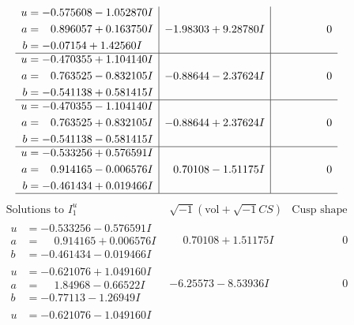 \documentclass[1p]{elsarticle_modified}
\theoremstyle{definition}
\newcommand{\I}{\sqrt{-1}}
\begin{document}
$$\begin{array}{c|c|c}
\begin{aligned}
u &= -0.575608 - 1.052870 I \\
a &= \phantom{-}0.896057 + 0.163750 I \\
b &= -0.07154 + 1.42560 I\end{aligned}
 & -1.98303 + 9.28780 I & \phantom{-0.000000 } 0 \\ \hline\begin{aligned}
u &= -0.470355 + 1.104140 I \\
a &= \phantom{-}0.763525 - 0.832105 I \\
b &= -0.541138 + 0.581415 I\end{aligned}
 & -0.88644 - 2.37624 I & \phantom{-0.000000 } 0 \\ \hline\begin{aligned}
u &= -0.470355 - 1.104140 I \\
a &= \phantom{-}0.763525 + 0.832105 I \\
b &= -0.541138 - 0.581415 I\end{aligned}
 & -0.88644 + 2.37624 I & \phantom{-0.000000 } 0 \\ \hline\begin{aligned}
u &= -0.533256 + 0.576591 I \\
a &= \phantom{-}0.914165 - 0.006576 I \\
b &= -0.461434 + 0.019466 I\end{aligned}
 & \phantom{-}0.70108 - 1.51175 I & \phantom{-0.000000 } 0\\
 \hline 
 \end{array}$$\newpage$$\begin{array}{c|c|c}  
\text{Solutions to }I^u_{1}& \I (\text{vol} + \sqrt{-1}CS) & \text{Cusp shape}\\
 \hline 
\begin{aligned}
u &= -0.533256 - 0.576591 I \\
a &= \phantom{-}0.914165 + 0.006576 I \\
b &= -0.461434 - 0.019466 I\end{aligned}
 & \phantom{-}0.70108 + 1.51175 I & \phantom{-0.000000 } 0 \\ \hline\begin{aligned}
u &= -0.621076 + 1.049160 I \\
a &= \phantom{-}1.84968 - 0.66522 I \\
b &= -0.77113 - 1.26949 I\end{aligned}
 & -6.25573 - 8.53936 I & \phantom{-0.000000 } 0 \\ \hline\begin{aligned}
u &= -0.621076 - 1.049160 I \\

\end{aligned}
\end{array}$$
\end{document}
